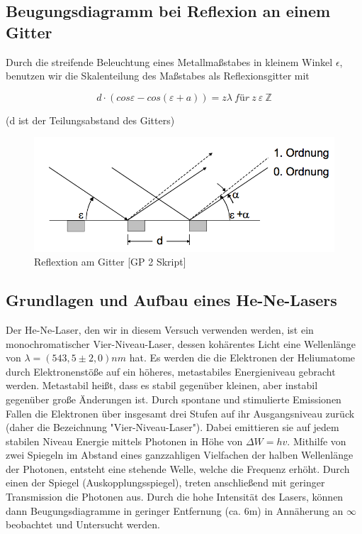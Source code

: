 \documentclass{article}
\begin{document}
\subsection{Beugungsdiagramm bei Reflexion an einem Gitter}
Durch die streifende Beleuchtung eines Metallmaßstabes in kleinem Winkel \(\epsilon\), benutzen wir die Skalenteilung des Maßstabes als Reflexionsgitter mit 

\begin{equation}
\label{5}
d \cdot (cos \varepsilon - cos( \varepsilon + a)) = z \lambda \ für \ z\ \varepsilon \ \mathds{Z}
\end{equation}

(d ist der Teilungsabstand des Gitters)

\begin{figure}[htbp]
\centering
\includegraphics[scale=0.3]{BEU3.png}
\begin{center}
\caption{Reflextion am Gitter [GP 2 Skript]}
\end{center}
\end{figure}

\subsection{Grundlagen und Aufbau eines He-Ne-Lasers}
Der He-Ne-Laser, den wir in diesem Versuch verwenden werden, ist ein monochromatischer Vier-Niveau-Laser, dessen kohärentes Licht eine Wellenlänge von \(\lambda = (543,5 \pm 2,0) nm \) hat. Es werden die die Elektronen der Heliumatome durch Elektronenstöße auf ein höheres, metastabiles Energieniveau gebracht werden. Metastabil heißt, dass es stabil gegenüber kleinen, aber instabil gegenüber große Änderungen ist. Durch spontane und stimulierte Emissionen Fallen die Elektronen über insgesamt drei Stufen auf ihr Ausgangsniveau zurück (daher die Bezeichnung "Vier-Niveau-Laser"). Dabei emittieren sie auf jedem stabilen Niveau Energie mittels Photonen in Höhe von \(\Delta W = hv \). Mithilfe von zwei Spiegeln im Abstand eines ganzzahligen Vielfachen der halben Wellenlänge der Photonen, entsteht eine stehende Welle, welche die Frequenz erhöht. Durch einen der Spiegel (Auskopplungsspiegel), treten anschließend mit geringer Transmission die Photonen aus.
Durch die hohe Intensität des Lasers, können dann Beugungsdiagramme in geringer Entfernung (ca. 6m) in Annäherung an \(\infty \) beobachtet und Untersucht werden.
\end{document}
